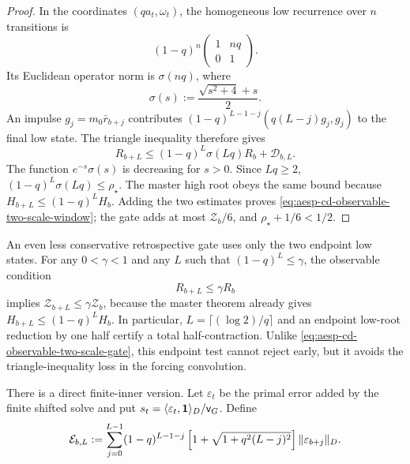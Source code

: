 \begin{proof}
In the coordinates $(qa_t,\omega_t)$, the homogeneous low recurrence over
$n$ transitions is
\begin{equation*}
 (1-q)^n
 \begin{pmatrix}1&nq\\0&1\end{pmatrix}.
\end{equation*}
Its Euclidean operator norm is
$\sigma(nq)$, where
\begin{equation*}
 \sigma(s):=\frac{\sqrt{s^2+4}+s}{2}.
\end{equation*}
An impulse $g_j=m_0\bar r_{b+j}$ contributes
$(1-q)^{L-1-j}(q(L-j)g_j,g_j)$ to the final low state.  The triangle
inequality therefore gives
\begin{equation*}
 R_{b+L}\leq(1-q)^L\sigma(Lq)R_b+\mathcal D_{b,L}.
\end{equation*}
The function $e^{-s}\sigma(s)$ is decreasing for $s>0$.  Since $Lq\geq2$,
$(1-q)^L\sigma(Lq)\leq\rho_\star$.  The master high root obeys the same
bound because $H_{b+L}\leq(1-q)^LH_b$.  Adding the two estimates proves
\cref{eq:aesp-cd-observable-two-scale-window}; the gate adds at most
$\mathcal Z_b/6$, and $\rho_\star+1/6<1/2$.
\end{proof}

An even less conservative retrospective gate uses only the two endpoint low
states.  For any $0<\gamma<1$ and any $L$ such that
$(1-q)^L\leq\gamma$, the observable condition
\begin{equation}
 R_{b+L}\leq\gamma R_b
 \label{eq:aesp-cd-two-scale-endpoint-gate}
\end{equation}
implies $\mathcal Z_{b+L}\leq\gamma\mathcal Z_b$, because the master theorem
already gives $H_{b+L}\leq(1-q)^LH_b$.  In particular,
$L=\lceil(\log 2)/q\rceil$ and an endpoint low-root reduction by one half
certify a total half-contraction.  Unlike
\cref{eq:aesp-cd-observable-two-scale-gate}, this endpoint test cannot reject
early, but it avoids the triangle-inequality loss in the forcing convolution.

There is a direct finite-inner version.  Let $\varepsilon_t$ be the primal
error added by the finite shifted solve and put
$s_t=\langle\varepsilon_t,\mathbf{1}\rangle_D/\mathsf v_G$.  Define
\begin{equation}
 \mathcal E_{b,L}
 :=\sum_{j=0}^{L-1}(1-q)^{L-1-j}
 \left[1+\sqrt{1+q^2(L-j)^2}\right]
 \lVert\varepsilon_{b+j}\rVert_D.
 \label{eq:aesp-cd-two-scale-finite-budget}
\end{equation}

